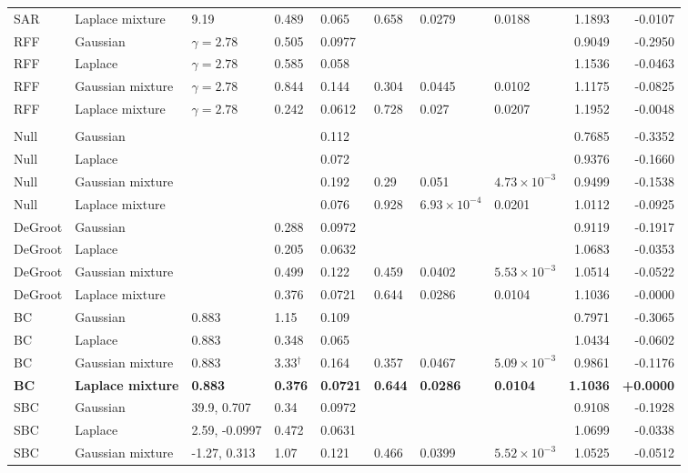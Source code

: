 \begin{longtable}{llllllllrr}
SAR & Laplace mixture & 9.19 & 0.489 & 0.065 & 0.658 & 0.0279 & 0.0188 & 1.1893 & -0.0107 \\
RFF & Gaussian & $\gamma=2.78$ & 0.505 & 0.0977 &  &  &  & 0.9049 & -0.2950 \\
RFF & Laplace & $\gamma=2.78$ & 0.585 & 0.058 &  &  &  & 1.1536 & -0.0463 \\
RFF & Gaussian mixture & $\gamma=2.78$ & 0.844 & 0.144 & 0.304 & 0.0445 & 0.0102 & 1.1175 & -0.0825 \\
RFF & Laplace mixture & $\gamma=2.78$ & 0.242 & 0.0612 & 0.728 & 0.027 & 0.0207 & 1.1952 & -0.0048 \\
\midrule
\multicolumn{10}{l}{\vkc{}} \\
Null & Gaussian &  &  & 0.112 &  &  &  & 0.7685 & -0.3352 \\
Null & Laplace &  &  & 0.072 &  &  &  & 0.9376 & -0.1660 \\
Null & Gaussian mixture &  &  & 0.192 & 0.29 & 0.051 & $4.73\times10^{-3}$ & 0.9499 & -0.1538 \\
Null & Laplace mixture &  &  & 0.076 & 0.928 & $6.93\times10^{-4}$ & 0.0201 & 1.0112 & -0.0925 \\
DeGroot & Gaussian &  & 0.288 & 0.0972 &  &  &  & 0.9119 & -0.1917 \\
DeGroot & Laplace &  & 0.205 & 0.0632 &  &  &  & 1.0683 & -0.0353 \\
DeGroot & Gaussian mixture &  & 0.499 & 0.122 & 0.459 & 0.0402 & $5.53\times10^{-3}$ & 1.0514 & -0.0522 \\
DeGroot & Laplace mixture &  & 0.376 & 0.0721 & 0.644 & 0.0286 & 0.0104 & 1.1036 & -0.0000 \\
BC & Gaussian & 0.883 & 1.15 & 0.109 &  &  &  & 0.7971 & -0.3065 \\
BC & Laplace & 0.883 & 0.348 & 0.065 &  &  &  & 1.0434 & -0.0602 \\
BC & Gaussian mixture & 0.883 & 3.33$^{\dagger}$ & 0.164 & 0.357 & 0.0467 & $5.09\times10^{-3}$ & 0.9861 & -0.1176 \\
\textbf{BC} & \textbf{Laplace mixture} & \textbf{0.883} & \textbf{0.376} & \textbf{0.0721} & \textbf{0.644} & \textbf{0.0286} & \textbf{0.0104} & \textbf{1.1036} & \textbf{+0.0000} \\
SBC & Gaussian & 39.9, 0.707 & 0.34 & 0.0972 &  &  &  & 0.9108 & -0.1928 \\
SBC & Laplace & 2.59, -0.0997 & 0.472 & 0.0631 &  &  &  & 1.0699 & -0.0338 \\
SBC & Gaussian mixture & -1.27, 0.313 & 1.07 & 0.121 & 0.466 & 0.0399 & $5.52\times10^{-3}$ & 1.0525 & -0.0512 \\

\end{longtable}
